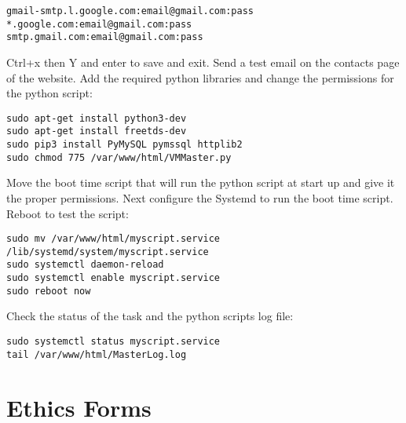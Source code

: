 \documentclass[a4paper,11pt]{article}
\numberwithin{figure}{section}
\numberwithin{table}{section}
\begin{document}
\begin{appendices}
\begin{lstlisting}[firstnumber=26]
gmail-smtp.l.google.com:email@gmail.com:pass
*.google.com:email@gmail.com:pass
smtp.gmail.com:email@gmail.com:pass
\end{lstlisting}
Ctrl+x then Y and enter to save and exit. Send a test email on the contacts page of the website. Add the required python libraries and change the permissions for the python script:
\begin{lstlisting}[firstnumber=29]
sudo apt-get install python3-dev
sudo apt-get install freetds-dev
sudo pip3 install PyMySQL pymssql httplib2
sudo chmod 775 /var/www/html/VMMaster.py
\end{lstlisting}
Move the boot time script that will run the python script at start up and give it the proper permissions. Next configure the Systemd to run the boot time script. Reboot to test the script:
\begin{lstlisting}[firstnumber=33]
sudo mv /var/www/html/myscript.service /lib/systemd/system/myscript.service
sudo systemctl daemon-reload
sudo systemctl enable myscript.service
sudo reboot now
\end{lstlisting}
Check the status of the task and the python scripts log file:
\begin{lstlisting}[firstnumber=37]
sudo systemctl status myscript.service
tail /var/www/html/MasterLog.log
\end{lstlisting}

\newpage

\section{Ethics Forms}\thispagestyle{sectionstart}
	\begin{changemargin}{-1cm}{-1cm}
	\begin{center}
	\texttt{[image: \{Signatureform]}.jpg}
	\end{center}
	\end{changemargin}		
\end{appendices}
\end{document}

